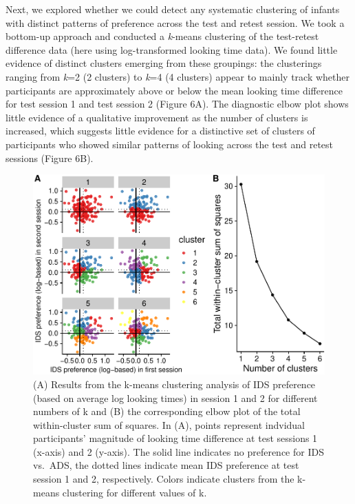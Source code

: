 \documentclass[
  man, donotrepeattitle,floatsintext]{apa6}
\begin{document}
Next, we explored whether we could detect any systematic clustering of infants with distinct patterns of preference across the test and retest session.
We took a bottom-up approach and conducted a \emph{k}-means clustering of the test-retest difference data (here using log-transformed looking time data).
We found little evidence of distinct clusters emerging from these groupings: the clusterings ranging from \emph{k}=2 (2 clusters) to \emph{k}=4 (4 clusters) appear to mainly track whether participants are approximately above or below the mean looking time difference for test session 1 and test session 2 (Figure 6A).
The diagnostic elbow plot shows little evidence of a qualitative improvement as the number of clusters is increased, which suggests little evidence for a distinctive set of clusters of participants who showed similar patterns of looking across the test and retest sessions (Figure 6B).

\begin{figure}
\centering
\includegraphics{MB1T_supplement_files/figure-latex/fig6-1.pdf}
\caption{\label{fig:fig6} (A) Results from the k-means clustering analysis of IDS preference (based on average log looking times) in session 1 and 2 for different numbers of k and (B) the corresponding elbow plot of the total within-cluster sum of squares. In (A), points represent indvidual participants' magnitude of looking time difference at test sessions 1 (x-axis) and 2 (y-axis). The solid line indicates no preference for IDS vs.~ADS, the dotted lines indicate mean IDS preference at test session 1 and 2, respectively. Colors indicate clusters from the k-means clustering for different values of k.}
\end{figure}
\end{document}
